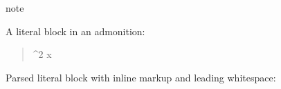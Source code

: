 \documentclass[a4paper]{article}
\begin{document}
\begin{DUclass}{note}
\begin{DUadmonition}

A literal block in an admonition:

\begin{quote}
\begin{verbatimtab}
\sin^2 x
\end{verbatimtab}
\end{quote}
\end{DUadmonition}
\end{DUclass}


Parsed literal block with inline markup and leading whitespace:
\end{document}
